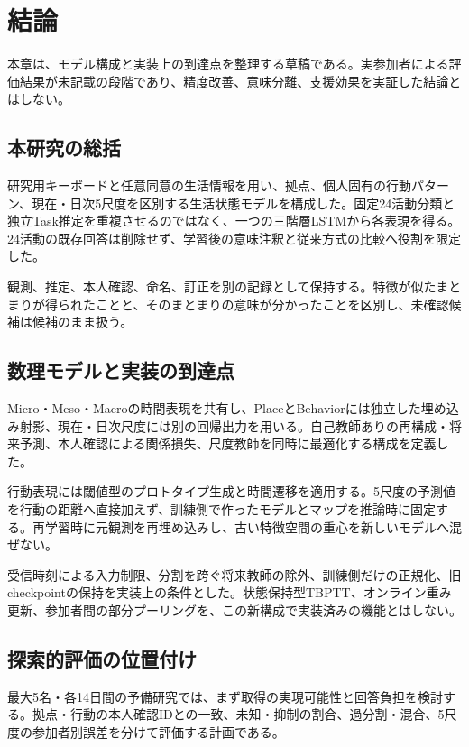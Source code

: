 \chapter{結論}
\label{chap:conclusion}

本章は、モデル構成と実装上の到達点を整理する草稿である。実参加者による評価結果が未記載の段階であり、精度改善、意味分離、支援効果を実証した結論とはしない。

\section{本研究の総括}

研究用キーボードと任意同意の生活情報を用い、拠点、個人固有の行動パターン、現在・日次5尺度を区別する生活状態モデルを構成した。固定24活動分類と独立Task推定を重複させるのではなく、一つの三階層LSTMから各表現を得る。24活動の既存回答は削除せず、学習後の意味注釈と従来方式の比較へ役割を限定した。

観測、推定、本人確認、命名、訂正を別の記録として保持する。特徴が似たまとまりが得られたことと、そのまとまりの意味が分かったことを区別し、未確認候補は候補のまま扱う。

\section{数理モデルと実装の到達点}

Micro・Meso・Macroの時間表現を共有し、PlaceとBehaviorには独立した埋め込み射影、現在・日次尺度には別の回帰出力を用いる。自己教師ありの再構成・将来予測、本人確認による関係損失、尺度教師を同時に最適化する構成を定義した。

行動表現には閾値型のプロトタイプ生成と時間遷移を適用する。5尺度の予測値を行動の距離へ直接加えず、訓練側で作ったモデルとマップを推論時に固定する。再学習時に元観測を再埋め込みし、古い特徴空間の重心を新しいモデルへ混ぜない。

受信時刻による入力制限、分割を跨ぐ将来教師の除外、訓練側だけの正規化、旧checkpointの保持を実装上の条件とした。状態保持型TBPTT、オンライン重み更新、参加者間の部分プーリングを、この新構成で実装済みの機能とはしない。

\section{探索的評価の位置付け}

最大5名・各14日間の予備研究では、まず取得の実現可能性と回答負担を検討する。拠点・行動の本人確認IDとの一致、未知・抑制の割合、過分割・混合、5尺度の参加者別誤差を分けて評価する計画である。


